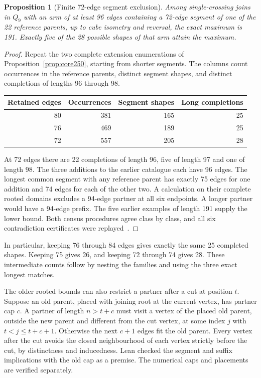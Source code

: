 \documentclass[11pt,a4paper]{article}
\newtheorem{proposition}[theorem]{Proposition}
\theoremstyle{definition}
\theoremstyle{remark}
\begin{document}
\begin{proposition}[Finite 72-edge segment exclusion]\label{prop:segment251}
Among single-crossing joins in $Q_9$ with an arm of at least 96 edges
containing a 72-edge segment of one of the 22 reference parents, up to
cube isometry and reversal, the exact maximum is 191. Exactly five of
the 28 possible shapes of that arm attain the maximum.
\end{proposition}
\begin{proof}
Repeat the two complete extension enumerations of
Proposition~\ref{prop:core250}, starting from shorter segments.
The columns count occurrences in the reference parents, distinct
segment shapes, and distinct completions of lengths 96 through 98.
\begin{center}
\begin{tabular}{rrrr}
\toprule
Retained edges & Occurrences & Segment shapes & Long completions\\
\midrule
80 & 381 & 165 & 25\\
76 & 469 & 189 & 25\\
72 & 557 & 205 & 28\\
\bottomrule
\end{tabular}
\end{center}
At 72 edges there are 22 completions of length 96, five of length 97
and one of length 98. The three additions to the earlier catalogue each
have 96 edges. The longest common segment with any reference parent
has exactly 75 edges for one addition and 74 edges for each of the
other two. A calculation on their complete rooted domains excludes a
94-edge partner at all six endpoints. A longer partner would have a
94-edge prefix. The five earlier examples of length 191 supply the
lower bound. Both census procedures agree class by class, and all six
contradiction certificates were replayed~\cite{segment251}.
\end{proof}

In particular, keeping 76 through 84 edges gives exactly the same
25 completed shapes. Keeping 75 gives 26, and keeping 72 through 74
gives 28. These intermediate counts follow by nesting the families
and using the three exact longest matches.

The older rooted bounds can also restrict a partner after a cut at
position $t$. Suppose an old parent, placed with joining root at the
current vertex, has partner cap $c$. A partner of length $n>t+c$ must
visit a vertex of the placed old parent, outside the new parent and
different from the cut vertex, at some index $j$ with
$t<j\le t+c+1$. Otherwise the next $c+1$ edges fit the old parent.
Every vertex after the cut avoids the closed neighbourhood of each
vertex strictly before the cut, by distinctness and inducedness.
Lean checked the segment and suffix implications with the old cap
as a premise. The numerical caps and placements are verified separately.
\end{document}
